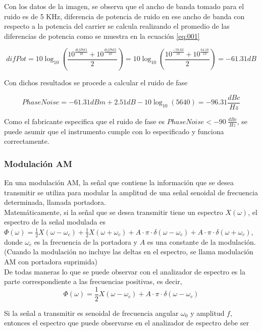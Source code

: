 \documentclass[a4paper,10pt]{article}
\begin{document}
		\indent Con los datos de la imagen, se observa que el ancho de banda 
		tomado para el ruido es de 5 KHz, diferencia de potencia de ruido en ese
		ancho de banda con respecto a la potencia del carrier se calcula 
		realizando el promedio de las diferencias de potencia como se muestra en
		la ecuaci\'on \ref{eq:001}

		\begin{equation} \label{eq:001}
			difPot = 10\log_{10}(\frac{10^{\frac{difPot1}{10}} + 10^{\frac
			{difPot2}{10}}}{2}) = 10\log_{10}(\frac{10^{\frac{-59.63}{10}} + 
			10^{\frac{64.10}{10}}}{2}) = -61.31 dB
		\end{equation}

		\indent Con dichos resultados se procede a calcular el ruido de fase
		
		\begin{equation*}
			PhaseNoise = -61.31dBm + 2.51dB - 10\log_{10}(5640) = -96.31 
			\frac{dBc}{Hz}
		\end{equation*}
		
		\indent Como el fabricante especifica que el ruido de fase es 
		$Phase Noise<-90~\frac{dBc}{Hz}$, se puede asumir que el instrumento 
		cumple con lo especificado y funciona correctamente.
		
		\subsubsection{Modulaci\'on AM}
		\indent En una modulaci\'on AM, la se\~nal que contiene la informaci\'on
		que se desea transmitir se utiliza para modular la amplitud de una 
		se\~nal senoidal de frecuencia determinada, llamada portadora. \\
		\indent Matem\'aticamente, si la se\~nal que se desea transmitir tiene 
		un espectro $X(\omega)$, el espectro de la se\~nal modulada es 
		$\Phi(\omega)=\frac{1}{2}X(\omega-\omega_c)+\frac{1}{2}X(
		\omega+\omega_c)+A\cdot\pi\cdot\delta(\omega-\omega_c)+A\cdot\pi\cdot
		\delta(\omega+\omega_c)$, donde $\omega_c$ es la frecuencia de la 
		portadora y $A$ es una constante de la modulaci\'on. (Cuando la 
		modulaci\'on no incluye las deltas en el espectro, se llama modulaci\'on
		AM con portadora suprimida) \\
		\indent De todas maneras lo que se puede observar con el analizador de 
		espectro es la parte correspondiente a las frecuencias positivas, es 
		decir,
		$$\Phi(\omega)=\frac{1}{2}X(\omega-\omega_c)+A\cdot\pi\cdot\delta(
		\omega-\omega_c)$$
		
		\indent Si la se\~nal a transmitir es senoidal de frecuencia angular 
		$\omega_0$ y amplitud $f$, entonces el espectro que puede observarse en 
		el analizador de espectro debe ser 
		
\end{document}
